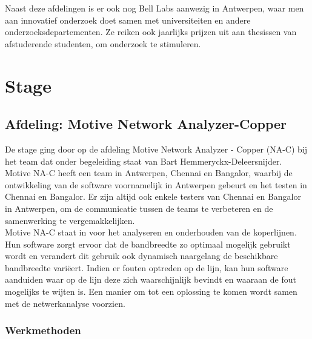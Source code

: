 \documentclass[10pt,a4paper]{article}
\begin{document}
Naast deze afdelingen is er ook nog Bell Labs aanwezig in Antwerpen, waar men aan innovatief onderzoek doet samen met universiteiten en andere onderzoeksdepartementen. Ze reiken ook jaarlijks prijzen uit aan thesissen van afstuderende studenten, om onderzoek te stimuleren. 

\section{Stage}
\label{stage}
\subsection{Afdeling: Motive Network Analyzer-Copper}
\label{afdeling}
De stage ging door op de afdeling Motive Network Analyzer - Copper (NA-C) bij het team dat onder begeleiding staat van Bart Hemmeryckx-Deleersnijder. Motive NA-C heeft een team in Antwerpen, Chennai en Bangalor, waarbij de ontwikkeling van de software voornamelijk in Antwerpen gebeurt en het testen in Chennai en Bangalor. Er zijn altijd ook enkele testers van Chennai en Bangalor in Antwerpen, om de communicatie tussen de teams te verbeteren en de samenwerking te vergemakkelijken.\\
Motive NA-C staat in voor het analyseren en onderhouden van de koperlijnen. Hun software zorgt ervoor dat de bandbreedte zo optimaal mogelijk gebruikt wordt en verandert dit gebruik ook dynamisch naargelang de beschikbare bandbreedte vari\"eert. Indien er fouten optreden op de lijn, kan hun software aanduiden waar op de lijn deze zich waarschijnlijk bevindt en waaraan de fout mogelijks te wijten is. Een manier om tot een oplossing te komen wordt samen met de netwerkanalyse voorzien.
\subsubsection{Werkmethoden}
\label{methoden}
\end{document}
